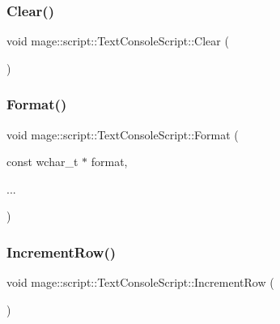 \subsubsection{\texorpdfstring{Clear()}{Clear()}}
{\footnotesize\ttfamily void mage\+::script\+::\+Text\+Console\+Script\+::\+Clear (\begin{DoxyParamCaption}{ }\end{DoxyParamCaption})}

\hypertarget{classmage_1_1script_1_1_text_console_script_a4c956a26976c553a20b4c3b1ec5e9e6b}{}\label{classmage_1_1script_1_1_text_console_script_a4c956a26976c553a20b4c3b1ec5e9e6b} 
\subsubsection{\texorpdfstring{Format()}{Format()}}
{\footnotesize\ttfamily void mage\+::script\+::\+Text\+Console\+Script\+::\+Format (\begin{DoxyParamCaption}\item[{const wchar\+\_\+t $\ast$}]{format,  }\item[{}]{... }\end{DoxyParamCaption})}

\hypertarget{classmage_1_1script_1_1_text_console_script_a3d4cba4fd8a2733933a7a444c6beaf1a}{}\label{classmage_1_1script_1_1_text_console_script_a3d4cba4fd8a2733933a7a444c6beaf1a} 
\subsubsection{\texorpdfstring{Increment\+Row()}{IncrementRow()}}
{\footnotesize\ttfamily void mage\+::script\+::\+Text\+Console\+Script\+::\+Increment\+Row (\begin{DoxyParamCaption}{ }\end{DoxyParamCaption})\hspace{0.3cm}{\ttfamily [private]}}

\hypertarget{classmage_1_1script_1_1_text_console_script_a68af2a144f641c9813b333544fe3562a}{}\label{classmage_1_1script_1_1_text_console_script_a68af2a144f641c9813b333544fe3562a} 
